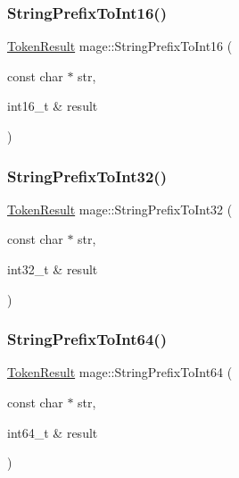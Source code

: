 \hypertarget{namespacemage_a8ad9257753f5f5288f8e09b2c99e544e}{}\label{namespacemage_a8ad9257753f5f5288f8e09b2c99e544e} 
\subsubsection{\texorpdfstring{String\+Prefix\+To\+Int16()}{StringPrefixToInt16()}}
{\footnotesize\ttfamily \hyperlink{namespacemage_a2178ba2411db5912f41b2e7698c2037d}{Token\+Result} mage\+::\+String\+Prefix\+To\+Int16 (\begin{DoxyParamCaption}\item[{const char $\ast$}]{str,  }\item[{int16\+\_\+t \&}]{result }\end{DoxyParamCaption})}

\hypertarget{namespacemage_a6fbea19380a6886e4e84f45d86d3379f}{}\label{namespacemage_a6fbea19380a6886e4e84f45d86d3379f} 
\subsubsection{\texorpdfstring{String\+Prefix\+To\+Int32()}{StringPrefixToInt32()}}
{\footnotesize\ttfamily \hyperlink{namespacemage_a2178ba2411db5912f41b2e7698c2037d}{Token\+Result} mage\+::\+String\+Prefix\+To\+Int32 (\begin{DoxyParamCaption}\item[{const char $\ast$}]{str,  }\item[{int32\+\_\+t \&}]{result }\end{DoxyParamCaption})}

\hypertarget{namespacemage_a8fda775d2c9f4f0a465d566540e91e82}{}\label{namespacemage_a8fda775d2c9f4f0a465d566540e91e82} 
\subsubsection{\texorpdfstring{String\+Prefix\+To\+Int64()}{StringPrefixToInt64()}}
{\footnotesize\ttfamily \hyperlink{namespacemage_a2178ba2411db5912f41b2e7698c2037d}{Token\+Result} mage\+::\+String\+Prefix\+To\+Int64 (\begin{DoxyParamCaption}\item[{const char $\ast$}]{str,  }\item[{int64\+\_\+t \&}]{result }\end{DoxyParamCaption})}

